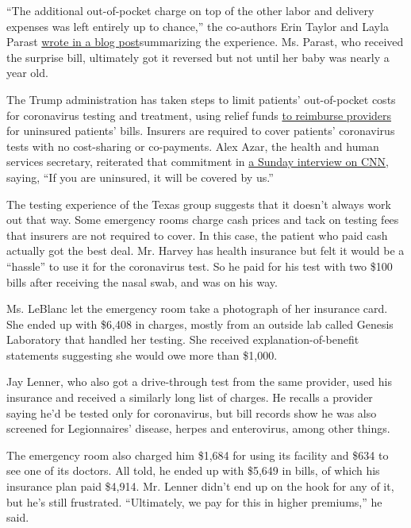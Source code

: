 ``The additional out-of-pocket charge on top of the other labor and
delivery expenses was left entirely up to chance,'' the co-authors Erin
Taylor and Layla Parast
\href{https://www.healthaffairs.org/do/10.1377/hblog20151103.051586/full/}{wrote
in a blog post}summarizing the experience. Ms. Parast, who received the
surprise bill, ultimately got it reversed but not until her baby was
nearly a year old.

The Trump administration has taken steps to limit patients'
out-of-pocket costs for coronavirus testing and treatment, using relief
funds
\href{https://www.hhs.gov/about/news/2020/04/27/hhs-launches-covid19-uninsured-program-portal.html}{to
reimburse providers} for uninsured patients' bills. Insurers are
required to cover patients' coronavirus tests with no cost-sharing or
co-payments. Alex Azar, the health and human services secretary,
reiterated that commitment in
\href{https://www.nytimes3xbfgragh.onion/2020/06/28/us/politics/coronavirus-sunday-talk-shows.html}{a
Sunday interview on CNN}, saying, ``If you are uninsured, it will be
covered by us.''

The testing experience of the Texas group suggests that it doesn't
always work out that way. Some emergency rooms charge cash prices and
tack on testing fees that insurers are not required to cover. In this
case, the patient who paid cash actually got the best deal. Mr. Harvey
has health insurance but felt it would be a ``hassle'' to use it for the
coronavirus test. So he paid for his test with two \$100 bills after
receiving the nasal swab, and was on his way.

Ms. LeBlanc let the emergency room take a photograph of her insurance
card. She ended up with \$6,408 in charges, mostly from an outside lab
called Genesis Laboratory that handled her testing. She received
explanation-of-benefit statements suggesting she would owe more than
\$1,000.

Jay Lenner, who also got a drive-through test from the same provider,
used his insurance and received a similarly long list of charges. He
recalls a provider saying he'd be tested only for coronavirus, but bill
records show he was also screened for Legionnaires' disease, herpes and
enterovirus, among other things.

The emergency room also charged him \$1,684 for using its facility and
\$634 to see one of its doctors. All told, he ended up with \$5,649 in
bills, of which his insurance plan paid \$4,914. Mr. Lenner didn't end
up on the hook for any of it, but he's still frustrated. ``Ultimately,
we pay for this in higher premiums,'' he said.

